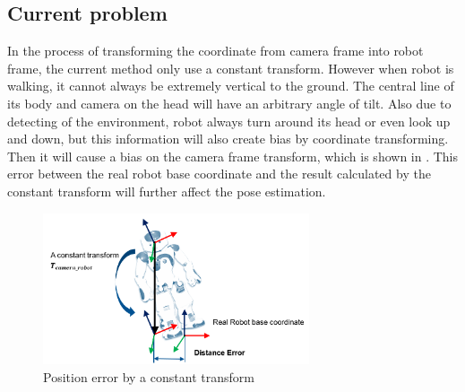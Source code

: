 \subsection{Current problem}
In the process of transforming the coordinate from camera frame into robot frame, the current method only use a constant transform. However when robot is walking, it cannot always be extremely vertical to the ground. The central line of its body and camera on the head will have an arbitrary angle of tilt. Also due to detecting of the environment, robot always turn around its head or even look up and down, but this information will also create bias by coordinate transforming. Then it will cause a bias on the camera frame transform, which is shown in . This error between the real robot base coordinate and the result calculated by the constant transform will further affect the pose estimation. 
\begin{figure}[!htb]
    \includegraphics[width=0.7\textwidth]{pics/error.png}
    \centering
    \caption{Position error by a constant transform}
    \label{fig: error}
\end{figure}\\

